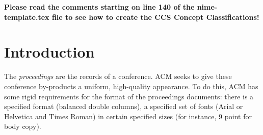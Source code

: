 \documentclass{nime-alternate} %
\begin{document}

%
% 
%


\printccsdesc

\textbf{Please read the comments starting on line 140 of the nime-template.tex file to see how to create the CCS Concept Classifications!} %


\section{Introduction}
The \textit{proceedings} are the records of a conference.
ACM seeks to give these conference by-products a uniform,
high-quality appearance.  To do this, ACM has some rigid
requirements for the format of the proceedings documents: there
is a specified format (balanced  double columns), a specified
set of fonts (Arial or Helvetica and Times Roman) in
certain specified sizes (for instance, 9 point for body copy).
\end{document}
